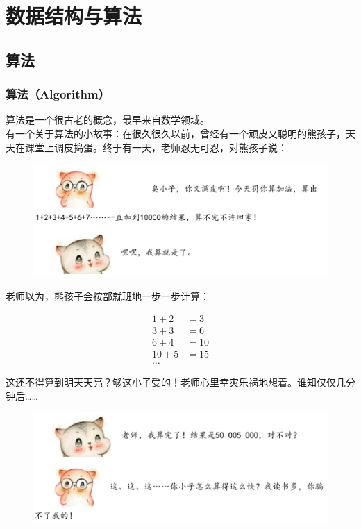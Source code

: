 \chapter{数据结构与算法}

\section{算法}

\subsection{算法（Algorithm）}

算法是一个很古老的概念，最早来自数学领域。 \\

有一个关于算法的小故事：在很久很久以前，曾经有一个顽皮又聪明的熊孩子，天天在课堂上调皮捣蛋。终于有一天，老师忍无可忍，对熊孩子说：

\begin{figure}[H]
	\centering
	\includegraphics[scale=0.7]{img/C1/1-1/1.png}
\end{figure}

老师以为，熊孩子会按部就班地一步一步计算：

\vspace{-1cm}

\begin{align*}
	1 + 2  & = 3  \\
	3 + 3  & = 6  \\
	6 + 4  & = 10 \\
	10 + 5 & = 15 \\
	\dots
\end{align*}

这还不得算到明天天亮？够这小子受的！老师心里幸灾乐祸地想着。谁知仅仅几分钟后……

\begin{figure}[H]
	\centering
	\includegraphics[scale=0.7]{img/C1/1-1/2.png}
\end{figure}

